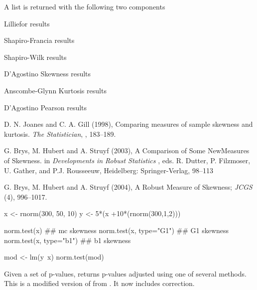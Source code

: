 \documentclass[a4paper]{book}
\begin{document}
%
\begin{Value}
A list is returned with the following two components

\begin{ldescription}
\item[\code{D }] Lilliefor results
\item[\code{W'}] Shapiro-Francia results
\item[\code{W }] Shapiro-Wilk results
\item[\code{Zb1 }] D'Agostino Skewness results
\item[\code{Zb2 }] Anscombe-Glynn Kurtosis results
\item[\code{Chi\textasciicircum{}2 }] D'Agostino Pearson results

\end{ldescription}
\end{Value}
%
\begin{References}\relax
D. N. Joanes and C. A. Gill (1998),
Comparing measures of sample skewness and kurtosis.
\emph{The Statistician}, , 183--189.

G. Brys, M. Hubert and A. Struyf (2003),
A Comparison of Some NewMeasures of Skewness.
in \emph{Developments in Robust Statistics} ,
eds. R. Dutter, P. Filzmoser, U. Gather, and P.J. Rousseeuw, Heidelberg:
Springer-Verlag, 98--113

G. Brys, M. Hubert and A. Struyf (2004),
A Robust Measure of Skewness;
\emph{JCGS}  (4), 996--1017.

\end{References}
%
\begin{Examples}
\begin{ExampleCode}
x <- rnorm(300, 50, 10)
y  <- 5*(x +10*(rnorm(300,1,2)))

norm.test(x)            ## mc skewness
norm.test(x, type="G1") ## G1 skewness
norm.test(x, type="b1") ## b1 skewness

mod <- lm(y~x)
norm.test(mod)

\end{ExampleCode}
\end{Examples}
\newpage
{}
%
\begin{Description}\relax
Given a set of p-values, returns p-values adjusted using
one of several methods.  This is a modified version of  from .
It now includes  correction.
\end{Description}
\end{document}
